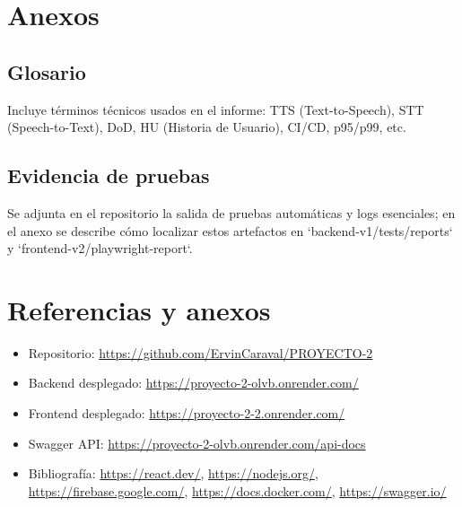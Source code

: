 \documentclass[12pt]{article}
\begin{document}
\section{Anexos}
\subsection{Glosario}
Incluye términos técnicos usados en el informe: TTS (Text-to-Speech), STT (Speech-to-Text), DoD, HU (Historia de Usuario), CI/CD, p95/p99, etc.

\subsection{Evidencia de pruebas}
Se adjunta en el repositorio la salida de pruebas automáticas y logs esenciales; en el anexo se describe cómo localizar estos artefactos en `backend-v1/tests/reports` y `frontend-v2/playwright-report`.


\vfill

\section{Referencias y anexos}
\begin{itemize}
    \item Repositorio: \url{https://github.com/ErvinCaraval/PROYECTO-2}
    \item Backend desplegado: \url{https://proyecto-2-olvb.onrender.com/}
    \item Frontend desplegado: \url{https://proyecto-2-2.onrender.com/}
    \item Swagger API: \url{https://proyecto-2-olvb.onrender.com/api-docs}
    \item Bibliografía: \url{https://react.dev/}, \url{https://nodejs.org/}, \url{https://firebase.google.com/}, \url{https://docs.docker.com/}, \url{https://swagger.io/}
\end{itemize}
\end{document}
